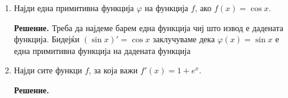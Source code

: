 \documentclass[12pt]{article}
\begin{document}
\begin{enumerate}[label=1.\arabic*]
  \item Најди една примитивна функција $\varphi$ на функција $f$, ако $f(x)=\cos x$.\par
        \textbf{Решение.} Треба да најдеме барем една функција чиј што извод е дадената функција. Бидејќи $(\sin x)'=\cos x$  заклучуваме дека $\varphi (x) =\sin x$ е една примитивна функција на дадената функција
  \item Најди сите функци $f$, за која важи $f'(x)=1+e^x$.
        \par  \textbf{Решение.}
\end{enumerate}
\end{document}
